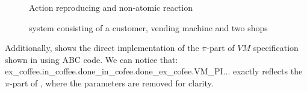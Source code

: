 \begin{figure}[H]%
\centering
{}%
\caption{Action reproducing and non-atomic reaction}
\label{non_atomic_reactoin}%
\end{figure}







\begin{figure}[H]%
\centering
{}%
\caption{system consisting of a customer, vending machine and two shops}
\label{sys_non_atomic_reactoin}%
\end{figure}

Additionally,  shows the direct implementation of the $\pi$-part of $VM$ specification shown in  using ABC code. We can notice that: \\
ex\_coffee.\textquotesingle in\_coffee.done\_in\_cofee.\textquotesingle done\_ex\_cofee.VM\_PI... exactly reflects the $\pi$-part of , where the parameters are removed for clarity.

